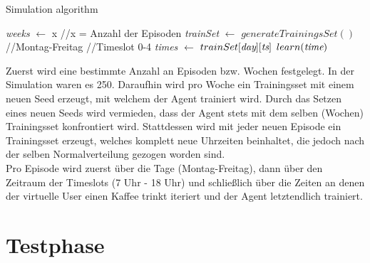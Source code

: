 \begin{algorithm}
    \caption{Simulation algorithm}\label{algo:sim}
    \begin{algorithmic}[1]
    \State \emph{weeks} $\gets$ x   \hfill         //x = Anzahl der Episoden
       \State \emph{trainSet} $\gets$ $generateTrainingsSet()$
           \hfill         //Montag-Freitag
              \hfill         //Timeslot 0-4
       \State \emph{times} $\gets$ $trainSet[\emph{day}][\emph{ts}]$
       \State $learn(\emph{time})$
       \EndFor
                \EndFor
            \EndFor
       \EndFor
    \end{algorithmic}
    \end{algorithm}

Zuerst wird eine bestimmte Anzahl an Episoden bzw. Wochen festgelegt. In der Simulation waren es 250. Daraufhin wird pro Woche ein Trainingsset mit einem neuen Seed erzeugt, mit welchem der Agent trainiert wird. Durch das Setzen eines neuen Seeds wird vermieden, dass der Agent stets mit dem selben (Wochen) Trainingsset konfrontiert wird. Stattdessen wird mit jeder neuen Episode ein Trainingsset erzeugt, welches komplett neue Uhrzeiten beinhaltet, die jedoch nach der selben Normalverteilung gezogen worden sind.\\
Pro Episode wird zuerst über die Tage (Montag-Freitag), dann über den Zeitraum der Timeslots (7 Uhr - 18 Uhr) und schließlich über die Zeiten an denen der virtuelle User einen Kaffee trinkt iteriert und der Agent letztendlich trainiert.\\

\section{Testphase}
\label{sec:testphase}

